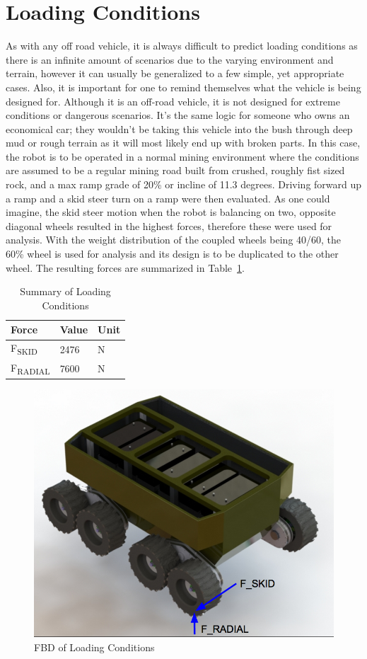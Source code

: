 \section{Loading Conditions}
As with any off road vehicle, it is always difficult to predict loading conditions as there is an infinite amount of scenarios due to the varying environment and terrain, however it can usually be generalized to a few simple, yet appropriate cases. Also, it is important for one to remind themselves what the vehicle is being designed for. Although it is an off-road vehicle, it is not designed for extreme conditions or dangerous scenarios. It's the same logic for someone who owns an economical car; they wouldn't be taking this vehicle into the bush through deep mud or rough terrain as it will most likely end up with broken parts. In this case, the robot is to be operated in a normal mining environment where the conditions are assumed to be a regular mining road built from crushed, roughly fist sized rock, and a max ramp grade of 20\% or incline of 11.3 degrees. Driving forward up a ramp and a skid steer turn on a ramp were then evaluated. As one could imagine, the skid steer motion when the robot is balancing on two, opposite diagonal wheels resulted in the highest forces, therefore these were used for analysis. With the weight distribution of the coupled wheels being 40/60, the 60\% wheel is used for analysis and its design is to be duplicated to the other wheel. The resulting forces are summarized in Table~\ref{tab:sumforces}.

\begin{table}[htbp]
	\centering
	\caption{Summary of Loading Conditions}
	\begin{tabular}{| p{5cm}ll |} \hline
		Force & Value & Unit \\ \hline
		F\textsubscript{SKID} & 2476 & N \\ \hline
		F\textsubscript{RADIAL} & 7600 & N \\ \hline
	\end{tabular}
	\label{tab:sumforces}
\end{table}

\begin{figure}[h]\centering
	\includegraphics[width=.7\linewidth]{images/loading_conditions.png}
	\caption{FBD of Loading Conditions}
	\label{fig:load_cond}
\end{figure}
   
